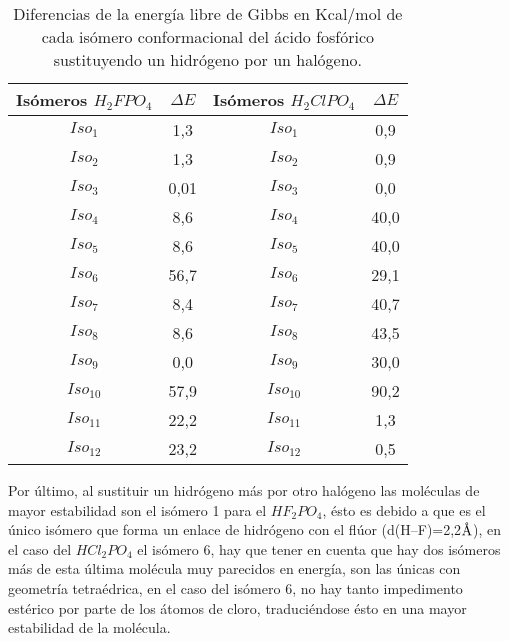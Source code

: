 \begin{table}[H]
\begin{center}
\begin{tabular}{|c|c|c|c|}
\hline
Isómeros $H_2FPO_4$ & $\Delta E$ & Isómeros $H_2ClPO_4$ & $\Delta E$ \\ \hline
$Iso_1$& 1,3 & $Iso_1$ & 0,9 \\ \hline
$Iso_2$ & 1,3 & $Iso_2$ & 0,9 \\ \hline
$Iso_3$ & 0,01 & $Iso_3$ & 0,0 \\ \hline
$Iso_4$	& 8,6 & $Iso_4$ & 40,0 \\ \hline
$Iso_5$	& 8,6 & $Iso_5$ & 40,0 \\ \hline
$Iso_6$	& 56,7 & $Iso_6$ & 29,1 \\ \hline
$Iso_7$	& 8,4 & $Iso_7$ & 40,7 \\ \hline
$Iso_8$	& 8,6 & $Iso_8$ & 43,5 \\ \hline
$Iso_9$	& 0,0 & $Iso_9$ & 30,0 \\ \hline
$Iso_{10}$	& 57,9 & $Iso_{10}$ & 90,2 \\ \hline
$Iso_{11}$ & 22,2 & $Iso_{11}$ & 1,3 \\ \hline
$Iso_{12}$ & 23,2 & $Iso_{12}$ & 0,5 \\ \hline
\end{tabular}
\caption{Diferencias de la energía libre de Gibbs en Kcal/mol de cada isómero conformacional del ácido fosfórico sustituyendo un hidrógeno por un halógeno.}
\end{center}
\end{table}

Por último, al sustituir un hidrógeno más por otro halógeno las moléculas de mayor estabilidad son el isómero 1 para el  $HF_2PO_4$, ésto es debido a que es el único isómero que forma un enlace de hidrógeno con el flúor (d(H--F)=2,2$\mbox{\normalfont\AA}$), en el caso del  $HCl_2PO_4$ el isómero 6, hay que tener en cuenta que hay dos isómeros más de esta última molécula muy parecidos en energía, son las únicas con geometría tetraédrica, en el caso del isómero 6, no hay tanto impedimento estérico por parte de los átomos de cloro, traduciéndose ésto en una mayor estabilidad de la molécula. 

